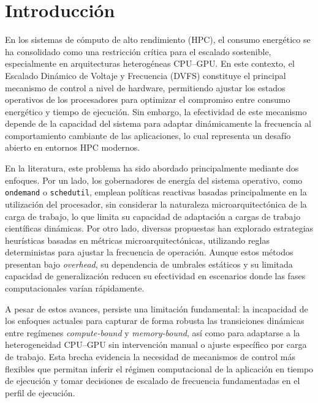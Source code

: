 \documentclass[12pt,oneside,spanish]{book}
\begin{document}

\chapter*{Introducción}
\setcounter{chapter}{0}
\setcounter{equation}{0}
\setcounter{figure}{0}
\setcounter{table}{0}

En los sistemas de cómputo de alto rendimiento (HPC), el consumo energético se ha consolidado como una restricción crítica para el escalado sostenible, especialmente en arquitecturas heterogéneas CPU--GPU. En este contexto, el Escalado Dinámico de Voltaje y Frecuencia (DVFS) constituye el principal mecanismo de control a nivel de hardware, permitiendo ajustar los estados operativos de los procesadores para optimizar el compromiso entre consumo energético y tiempo de ejecución. Sin embargo, la efectividad de este mecanismo depende de la capacidad del sistema para adaptar dinámicamente la frecuencia al comportamiento cambiante de las aplicaciones, lo cual representa un desafío abierto en entornos HPC modernos.

En la literatura, este problema ha sido abordado principalmente mediante dos enfoques. Por un lado, los gobernadores de energía del sistema operativo, como \texttt{ondemand} o \texttt{schedutil}, emplean políticas reactivas basadas principalmente en la utilización del procesador, sin considerar la naturaleza microarquitectónica de la carga de trabajo, lo que limita su capacidad de adaptación a cargas de trabajo científicas dinámicas. Por otro lado, diversas propuestas han explorado estrategias heurísticas basadas en métricas microarquitectónicas, utilizando reglas deterministas para ajustar la frecuencia de operación. Aunque estos métodos presentan bajo \textit{overhead}, su dependencia de umbrales estáticos y su limitada capacidad de generalización reducen su efectividad en escenarios donde las fases computacionales varían rápidamente.

A pesar de estos avances, persiste una limitación fundamental: la incapacidad de los enfoques actuales para capturar de forma robusta las transiciones dinámicas entre regímenes \textit{compute-bound} y \textit{memory-bound}, así como para adaptarse a la heterogeneidad CPU--GPU sin intervención manual o ajuste específico por carga de trabajo. Esta brecha evidencia la necesidad de mecanismos de control más flexibles que permitan inferir el régimen computacional de la aplicación en tiempo de ejecución y tomar decisiones de escalado de frecuencia fundamentadas en el perfil de ejecución.
\end{document}
